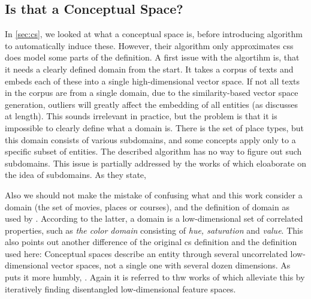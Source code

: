 \subsection{Is that a Conceptual Space?}

In \autoref{sec:cs}, we looked at what a conceptual space is, before introducing  algorithm to automatically induce these. However, their algorithm only approximates \glspl{cs} does model some parts of the definition. A first issue with the algortihm is, that it needs a clearly defined domain from the start. It takes a corpus of texts and embeds each of these into a single high-dimensional vector space. If not all texts in the corpus are from a single domain, due to the similarity-based vector space generation, outliers will greatly affect the embedding of all entities (as \cite{Ager2018} discusses at length). This sounds irrelevant in practice, but the problem is that it is impossible to clearly define what a domain is. There is the set of place types, but this domain consists of various subdomains, and some concepts apply only to a specific subset of entities. The described algorithm has no way to figure out such subdomains. This issue is partially addressed by the works of \textcite{Alshaikh2019, Alshaikh2020, Alshaikh2021} which eloaborate on the idea of subdomains. As they state, \textit{} \cite{Alshaikh2020}  

Also we should not make the mistake of confusing what \mainalgos and this work consider a domain (the set of movies, places or courses), and the definition of domain as used by \textcite{Gardenfors2000a}. According to the latter, a domain is a low-dimensional set of correlated properties, such as \textit{the color domain} consisting of \textit{hue, saturation} and \textit{value}. This also points out another difference of the original \gls{cs} definition and the definition used here: Conceptual spaces describe an entity through several uncorrelated low-dimensional vector spaces, not a single one with several dozen dimensions. As \cite{Ager2018} puts it more humbly, \textit{}. Again it is referred to thw works of \textcite{Alshaikh2019, Alshaikh2020, Alshaikh2021} which alleviate this by iteratively finding disentangled low-dimensional feature spaces.

